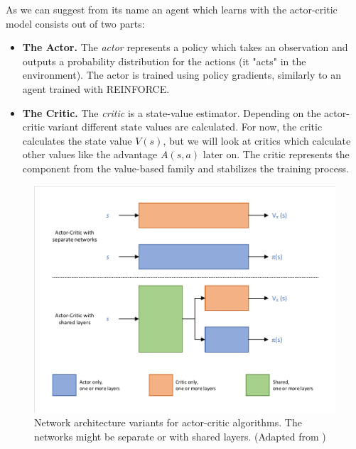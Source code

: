 As we can suggest from its name an agent which learns with the actor-critic model consists out of two parts: 
\begin{itemize}
  \item \textbf{The Actor.} The \textit{actor} represents a policy which takes an observation and outputs a probability distribution for the actions (it "acts" in the environment). The actor is trained using policy gradients, similarly to an agent trained with REINFORCE. 
  \item \textbf{The Critic.} The \textit{critic} is a state-value estimator. Depending on the actor-critic variant different state values are calculated. For now, the critic calculates the state value $V(s)$, but we will look at critics which calculate other values like the advantage $A(s, a)$ later on. The critic represents the component from the value-based family and stabilizes the training process.   
\end{itemize}

\begin{figure}[ht]
  
  \begin{center}
      \includegraphics[clip, trim=10px 10px 10px 10px, width=0.85\columnwidth]{figures/rl/Actor_Critic_Architecture.pdf}
  \end{center}
  
  \caption[Actor-Critic Network Architectures]{Network architecture variants for actor-critic algorithms. The networks might be separate or with shared layers. (Adapted from \cite{foundations2019graesser})}
  \label{fig:actor_critic_architecture}
\end{figure}

